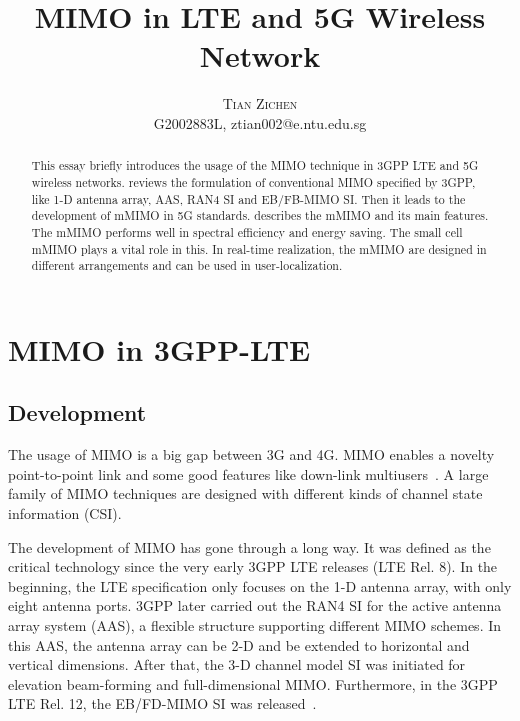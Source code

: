 \documentclass[12pt]{article}
\begin{document}
\title{\textbf{MIMO in LTE and 5G Wireless Network}}
\author{\textsc{Tian Zichen}\\ \normalsize{G2002883L, ztian002@e.ntu.edu.sg}}
\date{}
\maketitle

\begin{abstract}
    This essay briefly introduces the usage of the MIMO technique in 3GPP LTE and 5G wireless networks.  reviews the formulation of conventional MIMO specified by 3GPP, like 1-D antenna array, AAS, RAN4 SI and EB/FB-MIMO SI. Then it leads to the development of mMIMO in 5G standards.  describes the mMIMO and its main features. The mMIMO performs well in spectral efficiency and energy saving. The small cell mMIMO plays a vital role in this. In real-time realization, the mMIMO are designed in different arrangements and can be used in user-localization.
\end{abstract}

\section{MIMO in 3GPP-LTE}
\label{sec:4G}
\subsection{Development}
The usage of MIMO is a big gap between 3G and 4G. MIMO enables a novelty point-to-point link and some good features like down-link multiusers~\cite{li2010mimo}. A large family of MIMO techniques are designed with different kinds of channel state information (CSI).

The development of MIMO has gone through a long way. It was defined as the critical technology since the very early 3GPP LTE releases (LTE Rel. 8). In the beginning, the LTE specification only focuses on the 1-D antenna array, with only eight antenna ports. 3GPP later carried out the RAN4 SI for the active antenna array system (AAS), a flexible structure supporting different MIMO schemes. In this AAS, the antenna array can be 2-D and be extended to horizontal and vertical dimensions. After that, the 3-D channel model SI was initiated for elevation beam-forming and full-dimensional MIMO. Furthermore, in the 3GPP LTE Rel. 12, the EB/FD-MIMO SI was released~\cite{gpp201536}.
\end{document}
